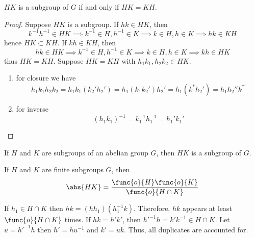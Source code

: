 \begin{lemma}
    \(HK\) is a subgroup of \(G\) if and only if \(HK = KH\).
\end{lemma}
\begin{proof}
    Suppose \(HK\) is a subgroup. If \(hk \in HK\), then
    \begin{equation*}
        k^{-1}h^{-1} \in HK \implies k^{-1} \in H, h^{-1} \in K \implies k \in H,h \in K \implies hk  \in KH 
    \end{equation*}
    hence \(HK \subset KH\). If \(kh \in KH\), then 
    \begin{equation*}
        hk \in HK  \implies k^{-1} \in H, h^{-1} \in K \implies k \in H,h \in K \implies kh \in HK 
    \end{equation*}
    thus \(HK = KH\). Suppose \(HK = KH\) with \(h_1k_1, h_2k_2 \in HK\).
    \begin{enumerate}
        \item for closure we have 
        \begin{equation*}
            h_1k_1 h_2 k_2 = h_1 k_1(k_2' h_2') = h_1 (k_1k_2') h_2' = h_1 (k^{\ast} h_2') = h_1 h_2'' k^{\ast'}
        \end{equation*}
        \item for inverse 
        \begin{equation*}
            (h_1k_1)^{-1} = k_1^{-1} h_1^{-1} = h_1' k_1'
        \end{equation*}
    \end{enumerate}
\end{proof}
\begin{corollary}
    If \(H\) and \(K\) are subgroups of an abelian group \(G\), then \(HK\) is a subgroup of \(G\).
\end{corollary}

\begin{lemma}
    If \(H\) and \(K\) are finite subgroups \(G\), then 
    \begin{equation*}
        \abs{HK} = \dfrac{\func{o}{H} \func{o}{K}}{\func{o}{H \cap K}}
    \end{equation*}
\end{lemma}

\begin{prooflemma}
    If \(h_1 \in H \cap K\) then \(hk = (hh_1)(h_1^{-1}k)\). Therefore, \(hk\) appears at least \(\func{o}{H \cap K}\) times. If \(hk = h'k'\), then \(h'^{-1}h = k' k^{-1} \in H \cap K\). Let \(u = h'^{-1}h\) then \(h' = hu^{-1}\) and \(k' = uk\). Thus, all duplicates are accounted for.
\end{prooflemma}


